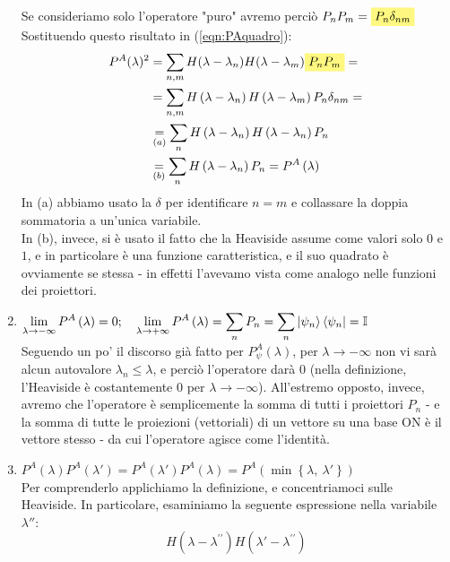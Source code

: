 \begin{enumerate}
	Se consideriamo solo l'operatore "puro" avremo perciò $P_n P_m = \hlc{Yellow}{P_n \delta_{nm}}$\\
	Sostituendo questo risultato in (\ref{eqn:PAquadro}):
	\begin{align*}
	P^A(\lambda)^2 &= \sum_{n,m} H(\lambda -\lambda_n)H(\lambda-\lambda_m) \hlc{Yellow}{P_n P_m} = \\
	&= \sum_{n,m}{H\left(\lambda-\lambda_n\right)H\left(\lambda-\lambda_m\right)P_n\delta_{nm}}= \\
	&\underset{(a)}{=} \sum_{n}{H\left(\lambda-\lambda_n\right)H\left(\lambda-\lambda_n\right)P_n}\\
	&\underset{(b)}{=}\sum_{n}{H\left(\lambda-\lambda_n\right)P_n}=P^A\left(\lambda\right)
	\end{align*}
	In (a) abbiamo usato la $\delta$ per identificare $n=m$ e collassare la doppia sommatoria a un'unica variabile.\\
	In (b), invece, si è usato il fatto che la Heaviside assume come valori solo $0$ e $1$, e in particolare è una funzione caratteristica, e il suo quadrato è ovviamente se stessa - in effetti l'avevamo vista come analogo nelle funzioni dei proiettori.
	\item $
	\displaystyle 
	\lim_{\lambda\rightarrow-\infty}{P^A\left(\lambda\right)=0};\quad 
	\lim_{\lambda\rightarrow+\infty}{P^A\left(\lambda\right)}=\sum_{n} P_n=\sum_{n}\left|\psi_n\right\rangle\left\langle\psi_n\right|=\mathbb{I}
	$\\
	Seguendo un po' il discorso già fatto per $P_\psi^A(\lambda)$, per $\lambda\to-\infty$ non vi sarà alcun autovalore $\lambda_n \leq \lambda$, e perciò l'operatore darà $0$ (nella definizione, l'Heaviside è costantemente $0$ per $\lambda\to -\infty$). All'estremo opposto, invece, avremo che l'operatore è semplicemente la somma di tutti i proiettori $P_n$ - e la somma di tutte le proiezioni (vettoriali) di un vettore su una base ON è il vettore stesso - da cui l'operatore agisce come l'identità. 
	\item 
	$\displaystyle P^A\left(\lambda\right)P^A\left(\lambda '\right)=P^A\left(\lambda '\right)P^A\left(\lambda\right)=P^A\left(\min{\left\{\lambda,\ \lambda '\right\}}\right) $\\
	Per comprenderlo applichiamo la definizione, e concentriamoci sulle Heaviside. In particolare, esaminiamo la seguente espressione nella variabile $\lambda''$:
	\[
	H\left(\lambda-\lambda^{\prime\prime}\right)H(\lambda '-\lambda^{\prime\prime})
\]
\end{enumerate}
